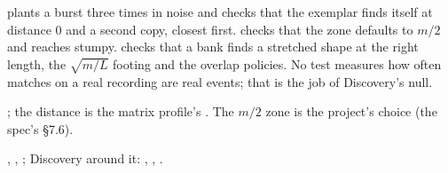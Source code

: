  plants a burst three times in noise and checks that the
exemplar finds itself at distance 0 and a second copy, closest first.
 checks that the zone defaults to $m/2$ and reaches stumpy.
 checks that a bank finds a stretched shape at the right
length, the $\sqrt{m/L}$ footing and the overlap policies. No test measures how often matches on a
real recording are real events; that is the job of Discovery's null.

 \citep{law2019stumpy}; the distance is the matrix profile's
\citep{yeh2016matrix}. The $m/2$ zone is the project's choice (the spec's \S7.6).

, ,
; Discovery around it: ,
, .
